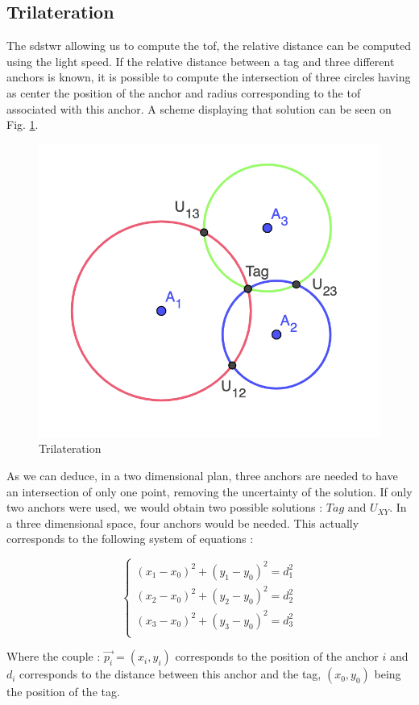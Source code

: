 \subsection{Trilateration}
\label{tril}

The \gls{sdstwr} allowing us to compute the \gls{tof}, the relative distance can be computed using the light speed. If the relative distance between a tag and three different anchors is known, it is possible to compute the intersection of three circles having as center the position of the anchor and radius corresponding to the \gls{tof} associated with this anchor. A scheme displaying that solution can be seen on Fig. \ref{fig:trilateration}.

\begin{figure}[H]
\centering
\includegraphics[width=.5\linewidth]{Images/trilateration.png}
\caption{Trilateration \label{fig:trilateration}}
\end{figure}

As we can deduce, in a two dimensional  plan, three anchors are needed to have an intersection of only one point, removing the uncertainty of the solution. If only two anchors were used, we would obtain two possible solutions : $Tag$ and $U_{XY}$. In a three dimensional space, four anchors would be needed. This actually corresponds to 
the following system of equations :

\begin{equation}
\label{eq:syst_exact}
\begin{cases}
(x_1 - x_0)^2 + (y_1 - y_0)^2 = d_1^2 \\
(x_2 - x_0)^2 + (y_2 - y_0)^2 = d_2^2 \\
(x_3 - x_0)^2 + (y_3 - y_0)^2 = d_3^2 \\
\end{cases}
\end{equation}

Where the couple : $\vec{p_i} = (x_i, y_i)$ corresponds to the position of the anchor $i$ and $d_i$ corresponds to the distance between this anchor and the tag, $(x_0, y_0)$ being the position of the tag.

